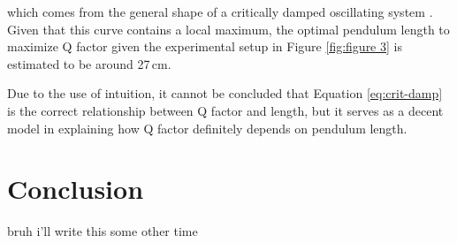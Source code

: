 \documentclass[11pt]{article}
\begin{document}
\begin{multicols}{2}
which comes from the general shape of a critically damped oscillating system \cite{crit-damping}. Given that this curve contains a local maximum, the optimal pendulum length to maximize Q factor given the experimental setup in Figure \ref{fig:figure 3} is estimated to be around 27\,cm.

Due to the use of intuition, it cannot be concluded that Equation \ref{eq:crit-damp} is the correct relationship between Q factor and length, but it serves as a decent model in explaining how Q factor definitely depends on pendulum length.

\section{Conclusion}
bruh i'll write this some other time

\newpage

\end{multicols}

\printbibliography[heading=bibintoc]

\newpage

\appendix

% 
\end{document}
